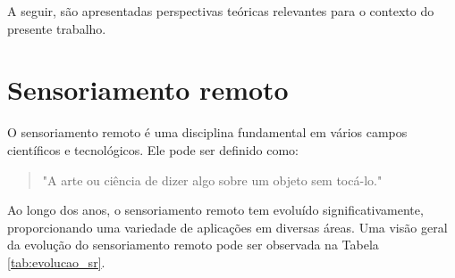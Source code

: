 A seguir, são apresentadas perspectivas teóricas relevantes para o contexto do presente
trabalho.
\section{Sensoriamento remoto}
O sensoriamento remoto é uma disciplina fundamental em vários campos científicos e tecnológicos. Ele pode ser definido  como:
\begin{quote}
"A arte ou ciência de dizer algo sobre um objeto sem tocá-lo." \parencite{fischer1976}
\end{quote}

Ao longo dos anos, o sensoriamento remoto tem evoluído significativamente, proporcionando uma variedade de aplicações em diversas áreas. Uma visão geral da evolução do sensoriamento remoto pode ser observada na Tabela \ref{tab:evolucao_sr}.

